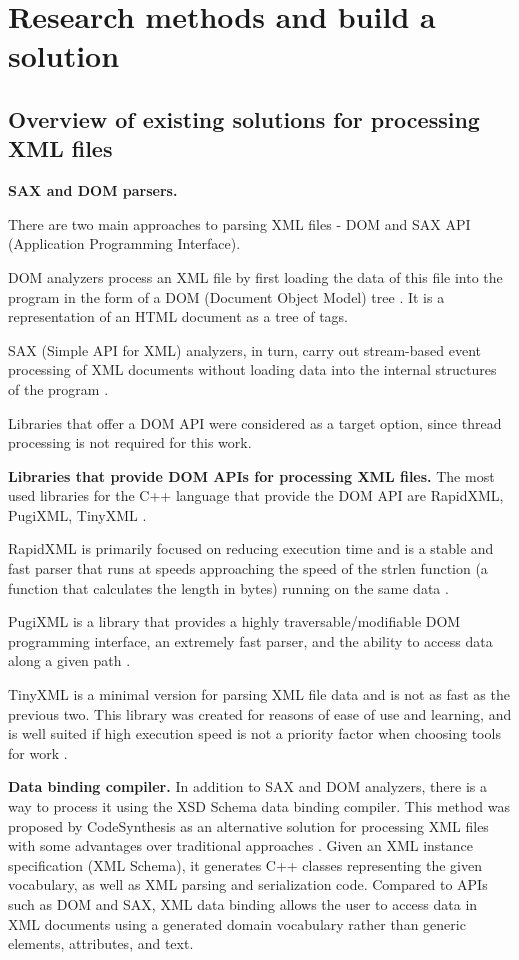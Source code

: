 \section{Research methods and build a solution}

\subsection{Overview of existing solutions for processing XML files}

\textbf{SAX and DOM parsers.}

There are two main approaches to parsing XML files - DOM and SAX API (Application Programming Interface).

DOM analyzers process an XML file by first loading the data of this file into the program in the form of a DOM (Document Object Model) tree \cite{m6}. It is a representation of an HTML document as a tree of tags.

SAX (Simple API for XML) analyzers, in turn, carry out stream-based event processing of XML documents without loading data into the internal structures of the program \cite{m7}.

Libraries that offer a DOM API were considered as a target option, since thread processing is not required for this work.

\textbf{Libraries that provide DOM APIs for processing XML files.} The most used libraries for the C++ language that provide the DOM API are RapidXML, PugiXML, TinyXML \cite{m9}.

RapidXML is primarily focused on reducing execution time and is a stable and fast parser that runs at speeds approaching the speed of the strlen function (a function that calculates the length in bytes) running on the same data \cite{m10}.

PugiXML is a library that provides a highly traversable/modifiable DOM programming interface, an extremely fast parser, and the ability to access data along a given path \cite{m11}.

TinyXML is a minimal version for parsing XML file data and is not as fast as the previous two. This library was created for reasons of ease of use and learning, and is well suited if high execution speed is not a priority factor when choosing tools for work \cite{m12}.

\textbf{Data binding compiler.} In addition to SAX and DOM analyzers, there is a way to process it using the XSD Schema data binding compiler. This method was proposed by CodeSynthesis as an alternative solution for processing XML files with some advantages over traditional approaches \cite{m14}. Given an XML instance specification (XML Schema), it generates C++ classes representing the given vocabulary, as well as XML parsing and serialization code. Compared to APIs such as DOM and SAX, XML data binding allows the user to access data in XML documents using a generated domain vocabulary rather than generic elements, attributes, and text.

